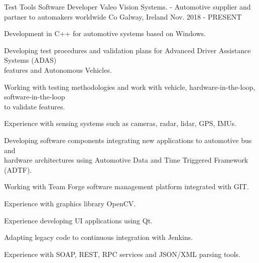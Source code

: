 

\begin{cventries}

  \cventry
    {Test Tools Software Developer} %
    {Valeo Vision Systems. - Automotive supplier and partner to automakers worldwide} %
    {Co Galway, Ireland} %
    {Nov. 2018 - PRESENT} %
    {
      \begin{cvitems} %
        \item {Development in C++ for automotive systems based on Windows.}
        \item {Developing test procedures and validation plans for Advanced Driver Assistance Systems (ADAS)\\
    features and Autonomous Vehicles.}
        \item {Working with testing methodologies and work with vehicle, hardware-in-the-loop, software-in-the-loop\\
    to validate features.}
        \item {Experience with sensing systems such as cameras, radar, lidar, GPS, IMUs.}
        \item {Developing software components integrating new applications to automotive bus and\\
    hardware architectures using Automotive Data and Time Triggered Framework (ADTF).}
        \item {Working with Team Forge software management platform integrated with GIT.}
        \item {Experience with graphics library OpenCV.}
        \item {Experience developing UI applications using Qt.}
        \item {Adapting legacy code to continuous integration with Jenkins.}
        \item {Experience with SOAP, REST, RPC services and JSON/XML parsing tools.}
      \end{cvitems}
    }


\end{cventries}
